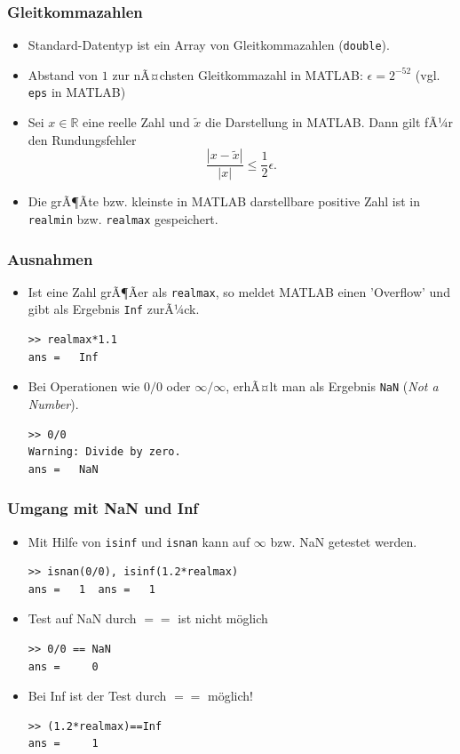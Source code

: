 \begin{frame}[fragile]\frametitle{Gleitkommazahlen}
\begin{itemize}
\item Standard-Datentyp ist ein Array von Gleitkommazahlen (\lstinline!double!).
\item Abstand von $1$ zur nÃ¤chsten Gleitkommazahl in MATLAB: $\epsilon
  =2^{-52}$ (vgl. \lstinline!eps! in MATLAB)
\item Sei $x \in \mathbb{R}$ eine reelle Zahl und $\tilde x$ die
  Darstellung in MATLAB. Dann gilt fÃ¼r den Rundungsfehler \\[-0.5cm]
\[ \frac{|x - \tilde x|}{|x|}\leq \frac{1}{2} \epsilon .\]
\item Die grÃ¶Ãte bzw. kleinste in MATLAB darstellbare positive Zahl
  ist in
\lstinline!realmin! bzw. \lstinline!realmax! gespeichert. 
\end{itemize}
\end{frame}
%
%
\begin{frame}[fragile]\frametitle{Ausnahmen}
\begin{itemize}
\item Ist eine Zahl grÃ¶Ãer als \lstinline!realmax!, so meldet MATLAB einen
  'Overflow' und gibt als Ergebnis \lstinline!Inf! zurÃ¼ck.
\begin{lstlisting}
>> realmax*1.1
ans =   Inf
\end{lstlisting}
\item Bei Operationen wie $0/0$  oder $\infty / \infty$, erhÃ¤lt man als Ergebnis
  \lstinline!NaN! ({\it Not a Number}).
\begin{lstlisting}
>> 0/0
Warning: Divide by zero.
ans =   NaN
\end{lstlisting}
\end{itemize}
\end{frame}
%
%
\begin{frame}[fragile]\frametitle{Umgang mit NaN und       Inf  }
\begin{itemize}
\item Mit Hilfe von \alert{ \lstinline!isinf!} und \alert{ \lstinline!isnan!} kann auf
$\infty$ bzw. NaN getestet werden.
 \begin{lstlisting}
>> isnan(0/0), isinf(1.2*realmax)
ans =   1  ans =   1
\end{lstlisting}
\item Test auf NaN durch $==$ ist nicht m\"oglich
\begin{lstlisting}
>> 0/0 == NaN
ans =     0
\end{lstlisting}
\item Bei Inf ist der Test durch $==$  m\"oglich!
\begin{lstlisting}
>> (1.2*realmax)==Inf
ans =     1
\end{lstlisting}
\end{itemize}
\end{frame}
